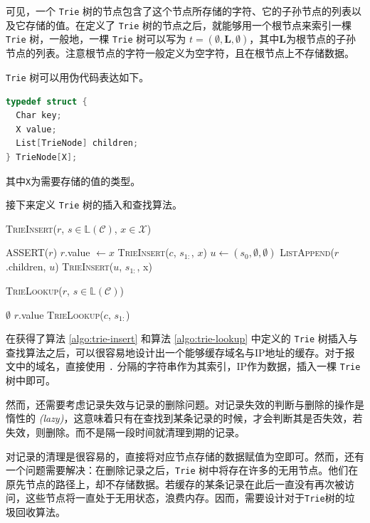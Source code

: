 可见，一个 \lstinline{Trie} 树的节点包含了这个节点所存储的字符、它的子孙节点的列表以及它存储的值。在定义了 \lstinline{Trie} 树的节点之后，就能够用一个根节点来索引一棵 \lstinline{Trie} 树，一般地，一棵 \lstinline{Trie} 树可以写为 $t = (\emptyset, \mathbf L, \emptyset)$，其中$\mathbf L$为根节点的子孙节点的列表。注意根节点的字符一般定义为空字符，且在根节点上不存储数据。

\lstinline{Trie} 树可以用伪代码表达如下。
\begin{lstlisting}[language=C]
typedef struct {
  Char key;
  X value;
  List[TrieNode] children;
} TrieNode[X];
\end{lstlisting}
其中\lstinline{X}为需要存储的值的类型。

接下来定义 \lstinline{Trie} 树的插入和查找算法。

\begin{algorithm}[h]
\caption{\textsc{TrieInsert}($r$, $s \in \mathds L(\mathcal C)$, $x \in \mathcal X$)}
\label{algo:trie-insert}
\textsc{ASSERT}($r$)\;
 {
  $r$.value $\gets x$\;
  \Return\;
}
 {
   {
    \textsc{TrieInsert}($c$, $s_{1:}$, $x$)\;
    \Return\;
  }
}
$u \gets (s_0, \emptyset, \emptyset)$\;
\textsc{ListAppend}($r$.children, $u$)\;
\textsc{TrieInsert}($u$, $s_{1:}$, x)\;
\end{algorithm}

\begin{algorithm}[h]
\caption{\textsc{TrieLookup}($r$, $s \in \mathds L(\mathcal C)$)}
\label{algo:trie-lookup}
 {
  \Return $\emptyset$\;
}
 {
  \Return $r$.value\;
}
 {
   {
    \Return \textsc{TrieLookup}($c$, $s_{1:}$)\;
  }
}
\end{algorithm}

在获得了算法 \ref{algo:trie-insert} 和算法 \ref{algo:trie-lookup} 中定义的 \lstinline{Trie} 树插入与查找算法之后，可以很容易地设计出一个能够缓存域名与IP地址的缓存。对于报文中的域名，直接使用 \lstinline{.} 分隔的字符串作为其索引，IP作为数据，插入一棵 \lstinline{Trie} 树中即可。

然而，还需要考虑记录失效与记录的删除问题。对记录失效的判断与删除的操作是惰性的 \emph{(lazy)}，这意味着只有在查找到某条记录的时候，才会判断其是否失效，若失效，则删除。而不是隔一段时间就清理到期的记录。

对记录的清理是很容易的，直接将对应节点存储的数据赋值为空即可。然而，还有一个问题需要解决：在删除记录之后，\lstinline{Trie} 树中将存在许多的无用节点。他们在原先节点的路径上，却不存储数据。若缓存的某条记录在此后一直没有再次被访问，这些节点将一直处于无用状态，浪费内存。因而，需要设计对于\lstinline{Trie}树的垃圾回收算法。

